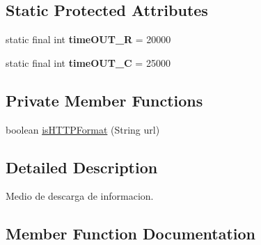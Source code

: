 \subsection*{Static Protected Attributes}
\begin{DoxyCompactItemize}
\item 
static final int {\bfseries time\+O\+U\+T\+\_\+R} = 20000\hypertarget{classcom_1_1example_1_1sebastian_1_1tindertp_1_1internetTools_1_1MediaDownloader_a9f013abe471a261df9d589cfebaf8b77}{}\label{classcom_1_1example_1_1sebastian_1_1tindertp_1_1internetTools_1_1MediaDownloader_a9f013abe471a261df9d589cfebaf8b77}

\item 
static final int {\bfseries time\+O\+U\+T\+\_\+C} = 25000\hypertarget{classcom_1_1example_1_1sebastian_1_1tindertp_1_1internetTools_1_1MediaDownloader_a2cfe74bc0e75d6d47726ab11596dc3c7}{}\label{classcom_1_1example_1_1sebastian_1_1tindertp_1_1internetTools_1_1MediaDownloader_a2cfe74bc0e75d6d47726ab11596dc3c7}

\end{DoxyCompactItemize}
\subsection*{Private Member Functions}
\begin{DoxyCompactItemize}
\item 
boolean \hyperlink{classcom_1_1example_1_1sebastian_1_1tindertp_1_1internetTools_1_1MediaDownloader_ac8e1d242c293e0a37c1a6027dc7a026a}{is\+H\+T\+T\+P\+Format} (String url)
\end{DoxyCompactItemize}


\subsection{Detailed Description}
Medio de descarga de informacion. 

\subsection{Member Function Documentation}
